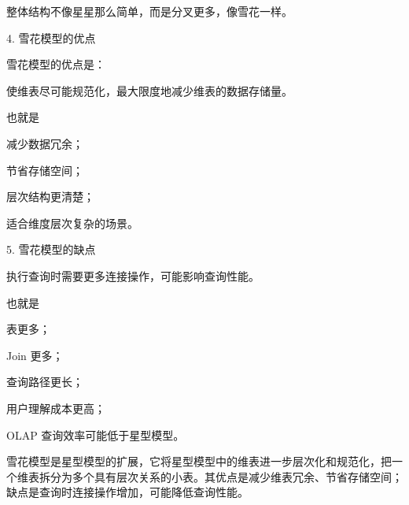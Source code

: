 \documentclass[UTF8,zihao=-4]{ctexart}
\begin{document}
整体结构不像星星那么简单，而是分叉更多，像雪花一样。\par

4. 雪花模型的优点\par

雪花模型的优点是：\par

使维表尽可能规范化，最大限度地减少维表的数据存储量。\par

也就是\par

减少数据冗余；\par
节省存储空间；\par
层次结构更清楚；\par
适合维度层次复杂的场景。\par

5. 雪花模型的缺点\par

执行查询时需要更多连接操作，可能影响查询性能。\par

也就是\par

表更多；\par
Join 更多；\par
查询路径更长；\par
用户理解成本更高；\par
OLAP 查询效率可能低于星型模型。\par

雪花模型是星型模型的扩展，它将星型模型中的维表进一步层次化和规范化，把一个维表拆分为多个具有层次关系的小表。其优点是减少维表冗余、节省存储空间；缺点是查询时连接操作增加，可能降低查询性能。\par
\end{document}
